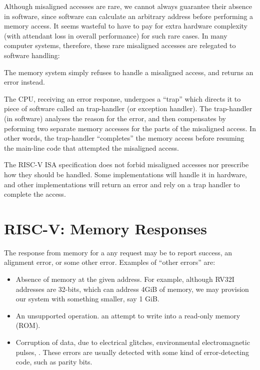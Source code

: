 Although misaligned accesses are rare, we cannot always guarantee
their absence in software, since software can calculate an arbitrary
address before performing a memory access.  It seems wasteful to have
to pay for extra hardware complexity (with attendant loss in overall
performance) for such rare cases.  In many computer systems,
therefore, these rare misaligned accesses are relegated to software
handling:

\begin{tightlist}

\item The memory system simply refuses to handle a misaligned access,
  and returns an error instead.

\item The CPU, receiving an error response, undergoes a ``trap'' which
  directs it to piece of software called an trap-handler (or exception
  handler).  The trap-handler (in software) analyses the reason for
  the error, and then compensates by peforming two separate memory
  accesses for the parts of the misaligned access. In other words, the
  trap-handler ``completes'' the memory access before resuming the
  main-line code that attempted the misaligned access.

\end{tightlist}

The RISC-V ISA specification does not forbid misaligned accesses nor
prescribe how they should be handled.  Some implementations will
handle it in hardware, and other implementations will return an error
and rely on a trap handler to complete the access.


\section{RISC-V: Memory Responses}


The response from memory for a any request may be to report success,
an alignment error, or some other error.  Examples of ``other errors''
are:

\begin{itemize}

\item Absence of memory at the given address.  For example, although
  RV32I addresses are 32-bits, which can address 4GiB of memory, we
  may provision our system with something smaller, say 1 GiB.

\item An unsupported operation. {\Eg} an attempt to write into a
  read-only memory (ROM).

\item Corruption of data, due to electrical glitches, environmental
  electromagnetic pulses, {\etc}.  These errors are usually detected
  with some kind of error-detecting code, such as parity bits.

\end{itemize}

